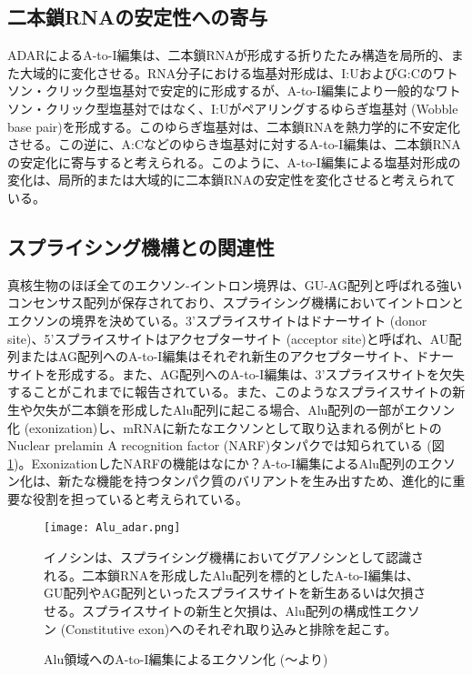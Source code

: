 \subsection{二本鎖RNAの安定性への寄与}
ADARによるA-to-I編集は、二本鎖RNAが形成する折りたたみ構造を局所的、また大域的に変化させる。RNA分子における塩基対形成は、I:UおよびG:Cのワトソン・クリック型塩基対で安定的に形成するが、A-to-I編集により一般的なワトソン・クリック型塩基対ではなく、I:Uがペアリングするゆらぎ塩基対 (Wobble base pair)を形成する。このゆらぎ塩基対は、二本鎖RNAを熱力学的に不安定化させる。この逆に、A:Cなどのゆらき塩基対に対するA-to-I編集は、二本鎖RNAの安定化に寄与すると考えられる。このように、A-to-I編集による塩基対形成の変化は、局所的または大域的に二本鎖RNAの安定性を変化させると考えられている。


\subsection{スプライシング機構との関連性}
真核生物のほぼ全てのエクソン-イントロン境界は、GU-AG配列と呼ばれる強いコンセンサス配列が保存されており、スプライシング機構においてイントロンとエクソンの境界を決めている。3'スプライスサイトはドナーサイト (donor site)、5'スプライスサイトはアクセプターサイト (acceptor site)と呼ばれ、AU配列またはAG配列へのA-to-I編集はそれぞれ新生のアクセプターサイト、ドナーサイトを形成する。また、AG配列へのA-to-I編集は、3'スプライスサイトを欠失することがこれまでに報告されている。また、このようなスプライスサイトの新生や欠失が二本鎖を形成したAlu配列に起こる場合、Alu配列の一部がエクソン化 (exonization)し、mRNAに新たなエクソンとして取り込まれる例がヒトのNuclear prelamin A recognition factor (NARF)タンパクでは知られている (図\ref{fig:Alu_adar})。ExonizationしたNARFの機能はなにか？A-to-I編集によるAlu配列のエクソン化は、新たな機能を持つタンパク質のバリアントを生み出すため、進化的に重要な役割を担っていると考えられている。

\begin{figure}[!h]
	\begin{center}
		\texttt{[image: Alu\_adar.png]}
	\end{center}
	\caption{Alu領域へのA-to-I編集によるエクソン化 (〜より)}
	\begin{flushleft}
		\small{イノシンは、スプライシング機構においてグアノシンとして認識される。二本鎖RNAを形成したAlu配列を標的としたA-to-I編集は、GU配列やAG配列といったスプライスサイトを新生あるいは欠損させる。スプライスサイトの新生と欠損は、Alu配列の構成性エクソン (Constitutive exon)へのそれぞれ取り込みと排除を起こす。}
	\end{flushleft}
	\label{fig:Alu_adar}
\end{figure}

